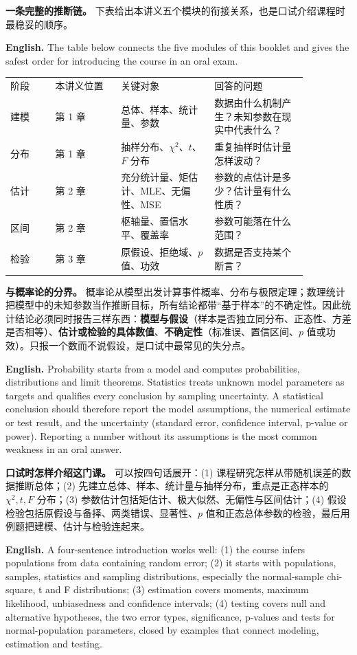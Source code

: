 \documentclass[UTF8,11pt,a4paper]{ctexart}
\newcommand{\EN}[1]{\par\noindent\textbf{English.} #1\par}
\begin{document}
\noindent\textbf{一条完整的推断链。} 下表给出本讲义五个模块的衔接关系，也是口试介绍课程时最稳妥的顺序。
\EN{The table below connects the five modules of this booklet and gives the safest order for introducing the course in an oral exam.}
\begin{center}
\small
\begin{tabular}{p{0.13\linewidth}p{0.19\linewidth}p{0.27\linewidth}p{0.27\linewidth}}
阶段 & 本讲义位置 & 关键对象 & 回答的问题\\
建模 & 第 1 章 & 总体、样本、统计量、参数 & 数据由什么机制产生？未知参数在现实中代表什么？\\
分布 & 第 1 章 & 抽样分布、$\chi^2$、$t$、$F$ 分布 & 重复抽样时估计量怎样波动？\\
估计 & 第 2 章 & 充分统计量、矩估计、MLE、无偏性、MSE & 参数的点估计是多少？估计量有什么性质？\\
区间 & 第 2 章 & 枢轴量、置信水平、覆盖率 & 参数可能落在什么范围？\\
检验 & 第 3 章 & 原假设、拒绝域、$p$ 值、功效 & 数据是否支持某个断言？\\
\end{tabular}
\end{center}

\noindent\textbf{与概率论的分界。} 概率论从模型出发计算事件概率、分布与极限定理；数理统计把模型中的未知参数当作推断目标，所有结论都带“基于样本”的不确定性。因此统计结论必须同时报告三样东西：\textbf{模型与假设}（样本是否独立同分布、正态性、方差是否相等）、\textbf{估计或检验的具体数值}、\textbf{不确定性}（标准误、置信区间、$p$ 值或功效）。只报一个数而不说假设，是口试中最常见的失分点。
\EN{Probability starts from a model and computes probabilities, distributions and limit theorems. Statistics treats unknown model parameters as targets and qualifies every conclusion by sampling uncertainty. A statistical conclusion should therefore report the model assumptions, the numerical estimate or test result, and the uncertainty (standard error, confidence interval, p-value or power). Reporting a number without its assumptions is the most common weakness in an oral answer.}

\noindent\textbf{口试时怎样介绍这门课。} 可以按四句话展开：(1) 课程研究怎样从带随机误差的数据推断总体；(2) 先建立总体、样本、统计量与抽样分布，重点是正态样本的 $\chi^2,t,F$ 分布；(3) 参数估计包括矩估计、极大似然、无偏性与区间估计；(4) 假设检验包括原假设与备择、两类错误、显著性、$p$ 值和正态总体参数的检验，最后用例题把建模、估计与检验连起来。
\EN{A four-sentence introduction works well: (1) the course infers populations from data containing random error; (2) it starts with populations, samples, statistics and sampling distributions, especially the normal-sample chi-square, t and F distributions; (3) estimation covers moments, maximum likelihood, unbiasedness and confidence intervals; (4) testing covers null and alternative hypotheses, the two error types, significance, p-values and tests for normal-population parameters, closed by examples that connect modeling, estimation and testing.}
\end{document}

